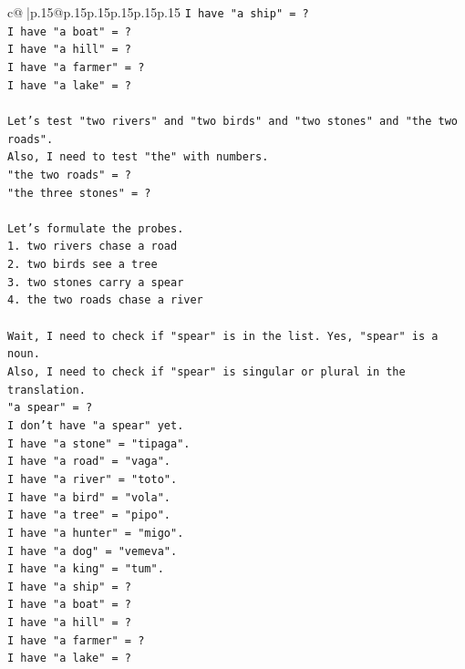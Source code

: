 \documentclass{article}
\begin{document}
{\begin{supertabular}{c@{$\;$}|p{.15\linewidth}@{}p{.15\linewidth}p{.15\linewidth}p{.15\linewidth}p{.15\linewidth}p{.15\linewidth}}
{{{\texttt{I have "a ship" = ?} \\
\texttt{I have "a boat" = ?} \\
\texttt{I have "a hill" = ?} \\
\texttt{I have "a farmer" = ?} \\
\texttt{I have "a lake" = ?} \\
\\ 
\texttt{Let's test "two rivers" and "two birds" and "two stones" and "the two roads".} \\
\texttt{Also, I need to test "the" with numbers.} \\
\texttt{"the two roads" = ?} \\
\texttt{"the three stones" = ?} \\
\\ 
\texttt{Let's formulate the probes.} \\
\texttt{1. two rivers chase a road} \\
\texttt{2. two birds see a tree} \\
\texttt{3. two stones carry a spear} \\
\texttt{4. the two roads chase a river} \\
\\ 
\texttt{Wait, I need to check if "spear" is in the list. Yes, "spear" is a noun.} \\
\texttt{Also, I need to check if "spear" is singular or plural in the translation.} \\
\texttt{"a spear" = ?} \\
\texttt{I don't have "a spear" yet.} \\
\texttt{I have "a stone" = "tipaga".} \\
\texttt{I have "a road" = "vaga".} \\
\texttt{I have "a river" = "toto".} \\
\texttt{I have "a bird" = "vola".} \\
\texttt{I have "a tree" = "pipo".} \\
\texttt{I have "a hunter" = "migo".} \\
\texttt{I have "a dog" = "vemeva".} \\
\texttt{I have "a king" = "tum".} \\
\texttt{I have "a ship" = ?} \\
\texttt{I have "a boat" = ?} \\
\texttt{I have "a hill" = ?} \\
\texttt{I have "a farmer" = ?} \\
\texttt{I have "a lake" = ?} \\
}}}
\end{supertabular}}
\end{document}
